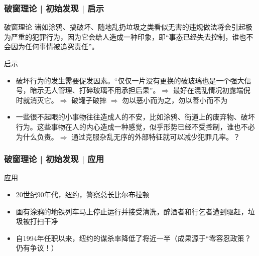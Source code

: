 \begin{frame}
  \frametitle{破窗理论 | 初始发现 | 启示}
  \begin{block}{破窗理论}
诸如涂鸦、搞破坏、随地乱扔垃圾之类看似无害的违规做法将会引起极为严重的犯罪行为，因为它会给人造成一种印象，即“事态已经失去控制，谁也不会因为任何事情被追究责任”。
  \end{block}
  \pause
  \begin{block}{启示}
    \begin{itemize}
    \item 破坏行为的发生需要促发因素。“仅仅一片没有更换的破玻璃也是一个强大信号，暗示无人管理、打碎玻璃不用承担后果”。$\Longrightarrow$ 最好在混乱情况初露端倪时就消灭它。$\Longrightarrow$ 破罐子破摔 $\Longrightarrow$ 勿以恶小而为之，勿以善小而不为
      \item 一些很不起眼的小事物往往造成人的不安，比如涂鸦、街道上的废弃物、破坏行为。这些事物在人的内心造成一种感觉，似乎形势已经不受控制，谁也不必为什么负责。$\Longrightarrow$ 通过克服杂乱无序的外部特征就可以减少犯罪几率。？
    \end{itemize}
  \end{block}
\end{frame}

\begin{frame}
  \frametitle{破窗理论 | 初始发现 | 应用}
  \begin{block}{应用}
    \begin{itemize}
      \item 20世纪90年代，纽约，警察总长比尔\textbullet 布拉顿
      \item 画有涂鸦的地铁列车马上停止运行并接受清洗，醉酒者和行乞者遭到驱赶，垃圾被打扫干净
      \item 自1994年任职以来，纽约的谋杀率降低了将近一半（成果源于“零容忍政策？仍有争议！）
    \end{itemize}
  \end{block}
\end{frame}

